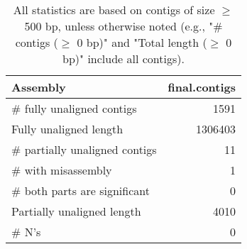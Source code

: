 \documentclass[12pt,a4paper]{article}
\begin{document}
\begin{table}[ht]
\begin{center}
\caption{All statistics are based on contigs of size $\geq$ 500 bp, unless otherwise noted (e.g., "\# contigs ($\geq$ 0 bp)" and "Total length ($\geq$ 0 bp)" include all contigs).}
\begin{tabular}{|l*{1}{|r}|}
\hline
Assembly & final.contigs \\ \hline
\# fully unaligned contigs & 1591 \\ \hline
Fully unaligned length & 1306403 \\ \hline
\# partially unaligned contigs & 11 \\ \hline
\hspace{5mm}\# with misassembly & 1 \\ \hline
\hspace{5mm}\# both parts are significant & 0 \\ \hline
Partially unaligned length & 4010 \\ \hline
\# N's & 0 \\ \hline
\end{tabular}
\end{center}
\end{table}
\end{document}
